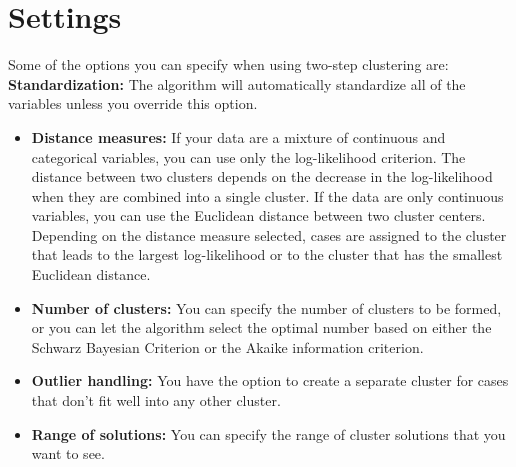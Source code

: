 \documentclass[a4paper,12pt]{article}
\begin{document}
\section*{Settings}
Some of the options you can specify when using two-step clustering are:
\textbf{Standardization:} The algorithm will automatically standardize all of the variables
unless you override this option.
\begin{itemize}
	\item \textbf{Distance measures:} If your data are a mixture of continuous and categorical variables,
	you can use only the log-likelihood criterion. The distance between two clusters
	depends on the decrease in the log-likelihood when they are combined into a single
	cluster. If the data are only continuous variables, you can use the Euclidean
	distance between two cluster centers. Depending on the distance measure selected,
	cases are assigned to the cluster that leads to the largest log-likelihood or to the cluster
	that has the smallest Euclidean distance.
	
	
\item \textbf{Number of clusters:} You can specify the number of clusters to be formed, or you can let
	the algorithm select the optimal number based on either the Schwarz Bayesian
	Criterion or the Akaike information criterion.
	
	
\item \textbf{Outlier handling:} You have the option to create a separate cluster for cases that don't fit
	well into any other cluster.
	\item 
	\textbf{Range of solutions:} You can specify the range of cluster solutions that you want to see.
\end{itemize}
\end{document}
